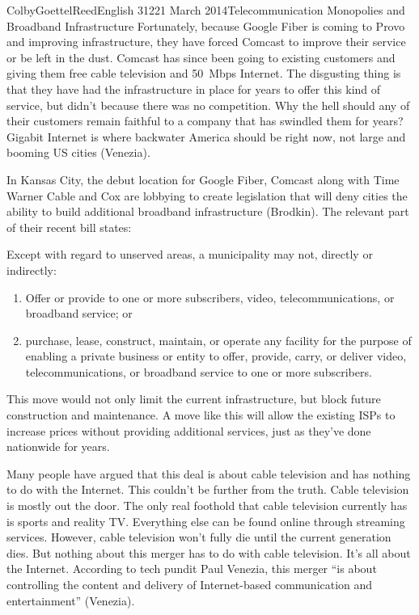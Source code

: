 \documentclass[12pt]{article}
\begin{document}
\begin{mla}{Colby}{Goettel}{Reed}{English 312}{21 March 2014}{Telecommunication Monopolies and Broadband Infrastructure}
Fortunately, because Google Fiber is coming to Provo and improving infrastructure, they have forced Comcast to improve their service or be left in the dust. Comcast has since been going to existing customers and giving them free cable television and 50~Mbps Internet. The disgusting thing is that they have had the infrastructure in place for years to offer this kind of service, but didn't because there was no competition. Why the hell should any of their customers remain faithful to a company that has swindled them for years? Gigabit Internet is where backwater America should be right now, not large and booming US cities (Venezia).

In Kansas City, the debut location for Google Fiber, Comcast along with Time Warner Cable and Cox are lobbying to create legislation that will deny cities the ability to build additional broadband infrastructure (Brodkin). The relevant part of their recent bill states:
\begin{mlaquote}
    Except with regard to unserved areas, a municipality may not, directly or indirectly:
    
    \begin{enumerate}
        \item Offer or provide to one or more subscribers, video, telecommunications, or broadband service; or
        \item purchase, lease, construct, maintain, or operate any facility for the purpose of enabling a private business or entity to offer, provide, carry, or deliver video, telecommunications, or broadband service to one or more subscribers.
    \end{enumerate}
\end{mlaquote}
This move would not only limit the current infrastructure, but block future construction and maintenance. A move like this will allow the existing ISPs to increase prices without providing additional services, just as they've done nationwide for years.

Many people have argued that this deal is about cable television and has nothing to do with the Internet. This couldn't be further from the truth. Cable television is mostly out the door. The only real foothold that cable television currently has is sports and reality TV. Everything else can be found online through streaming services. However, cable television won't fully die until the current generation dies. But nothing about this merger has to do with cable television. It's all about the Internet. According to tech pundit Paul Venezia, this merger ``is about controlling the content and delivery of Internet-based communication and entertainment'' (Venezia).


\end{mla}
\end{document}
